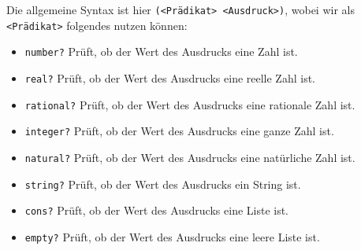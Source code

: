 	
		Die allgemeine Syntax ist hier \texttt{(<Prädikat> <Ausdruck>)}, wobei wir als \texttt{<Prädikat>} folgendes nutzen können:
		\begin{itemize}
			\item \lstinline[language = Racket]|number?|   \tabto{2cm} Prüft, ob der Wert des Ausdrucks eine Zahl ist.
			\item \lstinline[language = Racket]|real?|     \tabto{2cm} Prüft, ob der Wert des Ausdrucks eine reelle Zahl ist.
			\item \lstinline[language = Racket]|rational?| \tabto{2cm} Prüft, ob der Wert des Ausdrucks eine rationale Zahl ist.
			\item \lstinline[language = Racket]|integer?|  \tabto{2cm} Prüft, ob der Wert des Ausdrucks eine ganze Zahl ist.
			\item \lstinline[language = Racket]|natural?|  \tabto{2cm} Prüft, ob der Wert des Ausdrucks eine natürliche Zahl ist.
			\item \lstinline[language = Racket]|string?|   \tabto{2cm} Prüft, ob der Wert des Ausdrucks ein String ist.
			\item \lstinline[language = Racket]|cons?|     \tabto{2cm} Prüft, ob der Wert des Ausdrucks eine Liste ist.
			\item \lstinline[language = Racket]|empty?|    \tabto{2cm} Prüft, ob der Wert des Ausdrucks eine leere Liste ist.
		\end{itemize}

